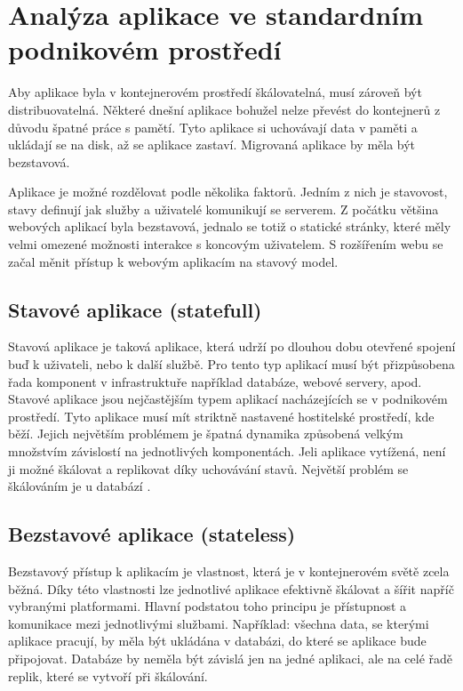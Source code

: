 \chapter{Analýza aplikace ve standardním podnikovém prostředí}
Aby aplikace byla v kontejnerovém prostředí škálovatelná, musí zároveň být distribuovatelná. Některé dnešní aplikace bohužel nelze převést do kontejnerů z důvodu špatné práce s pamětí. Tyto aplikace si uchovávají data v paměti a ukládají se na disk, až se aplikace zastaví. Migrovaná aplikace by měla být bezstavová.   

Aplikace je možné rozdělovat podle několika faktorů. Jedním z nich je stavovost, stavy definují jak služby a uživatelé komunikují se serverem. Z počátku většina webových aplikací byla bezstavová, jednalo se totiž o statické stránky, které měly velmi omezené možnosti interakce s koncovým uživatelem. S rozšířením webu se začal měnit přístup k webovým aplikacím na stavový model.

\section{Stavové aplikace (statefull)}
Stavová aplikace je taková aplikace, která udrží po dlouhou dobu otevřené spojení buď k uživateli, nebo k další službě. Pro tento typ aplikací musí být přizpůsobena řada komponent v infrastruktuře například databáze, webové servery, apod. Stavové aplikace jsou nejčastějším typem aplikací nacházejících se v podnikovém prostředí. Tyto aplikace musí mít striktně nastavené hostitelské prostředí, kde běží. Jejich největším problémem je špatná dynamika způsobená velkým množstvím závislostí na jednotlivých komponentách. Jeli aplikace vytížená, není ji možné škálovat a replikovat díky uchovávání stavů. Největší problém se škálováním je u databází .

\section{Bezstavové aplikace (stateless)}
Bezstavový přístup k aplikacím je vlastnost, která je v kontejnerovém světě zcela běžná. Díky této vlastnosti lze jednotlivé aplikace efektivně škálovat a šířit napříč vybranými platformami. Hlavní podstatou toho principu je přístupnost a komunikace mezi jednotlivými službami. Například: všechna data, se kterými aplikace pracují, by měla být ukládána v databázi, do které se aplikace bude připojovat. Databáze by neměla být závislá jen na jedné aplikaci, ale na celé řadě replik, které se vytvoří při škálování. 


